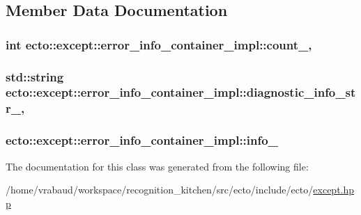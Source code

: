 \subsection{Member Data Documentation}
\hypertarget{classecto_1_1except_1_1error__info__container__impl_ade4abdc4aa11c62dd39847bc4f6c619c}{
\subsubsection[{count\-\_\-}]{\setlength{\rightskip}{0pt plus 5cm}int ecto\-::except\-::error\-\_\-info\-\_\-container\-\_\-impl\-::count\-\_\-\hspace{0.3cm}{\ttfamily [mutable]}, {\ttfamily [private]}}}\label{classecto_1_1except_1_1error__info__container__impl_ade4abdc4aa11c62dd39847bc4f6c619c}
\hypertarget{classecto_1_1except_1_1error__info__container__impl_aeb86496a5127e19e9f787e77531b1b83}{
\subsubsection[{diagnostic\-\_\-info\-\_\-str\-\_\-}]{\setlength{\rightskip}{0pt plus 5cm}std\-::string ecto\-::except\-::error\-\_\-info\-\_\-container\-\_\-impl\-::diagnostic\-\_\-info\-\_\-str\-\_\-\hspace{0.3cm}{\ttfamily [mutable]}, {\ttfamily [private]}}}\label{classecto_1_1except_1_1error__info__container__impl_aeb86496a5127e19e9f787e77531b1b83}
\hypertarget{classecto_1_1except_1_1error__info__container__impl_a8ec60b174805696bd691a894b7f4109f}{
\subsubsection[{info\-\_\-}]{ ecto\-::except\-::error\-\_\-info\-\_\-container\-\_\-impl\-::info\-\_\-\hspace{0.3cm}{\ttfamily [private]}}}\label{classecto_1_1except_1_1error__info__container__impl_a8ec60b174805696bd691a894b7f4109f}


The documentation for this class was generated from the following file\-:\begin{DoxyCompactItemize}
\item 
/home/vrabaud/workspace/recognition\-\_\-kitchen/src/ecto/include/ecto/\hyperlink{except_8hpp}{except.\-hpp}\end{DoxyCompactItemize}
